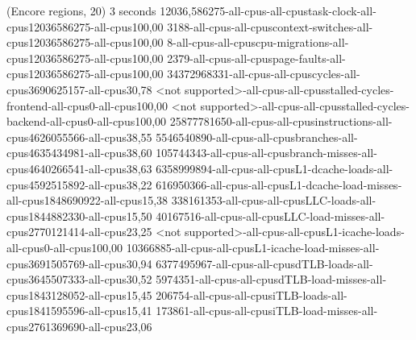 (Encore regions, 20)
3 seconds
12036,586275-all-cpus-all-cpustask-clock-all-cpus12036586275-all-cpus100,00
3188-all-cpus-all-cpuscontext-switches-all-cpus12036586275-all-cpus100,00
8-all-cpus-all-cpuscpu-migrations-all-cpus12036586275-all-cpus100,00
2379-all-cpus-all-cpuspage-faults-all-cpus12036586275-all-cpus100,00
34372968331-all-cpus-all-cpuscycles-all-cpus3690625157-all-cpus30,78
<not supported>-all-cpus-all-cpusstalled-cycles-frontend-all-cpus0-all-cpus100,00
<not supported>-all-cpus-all-cpusstalled-cycles-backend-all-cpus0-all-cpus100,00
25877781650-all-cpus-all-cpusinstructions-all-cpus4626055566-all-cpus38,55
5546540890-all-cpus-all-cpusbranches-all-cpus4635434981-all-cpus38,60
105744343-all-cpus-all-cpusbranch-misses-all-cpus4640266541-all-cpus38,63
6358999894-all-cpus-all-cpusL1-dcache-loads-all-cpus4592515892-all-cpus38,22
616950366-all-cpus-all-cpusL1-dcache-load-misses-all-cpus1848690922-all-cpus15,38
338161353-all-cpus-all-cpusLLC-loads-all-cpus1844882330-all-cpus15,50
40167516-all-cpus-all-cpusLLC-load-misses-all-cpus2770121414-all-cpus23,25
<not supported>-all-cpus-all-cpusL1-icache-loads-all-cpus0-all-cpus100,00
10366885-all-cpus-all-cpusL1-icache-load-misses-all-cpus3691505769-all-cpus30,94
6377495967-all-cpus-all-cpusdTLB-loads-all-cpus3645507333-all-cpus30,52
5974351-all-cpus-all-cpusdTLB-load-misses-all-cpus1843128052-all-cpus15,45
206754-all-cpus-all-cpusiTLB-loads-all-cpus1841595596-all-cpus15,41
173861-all-cpus-all-cpusiTLB-load-misses-all-cpus2761369690-all-cpus23,06
